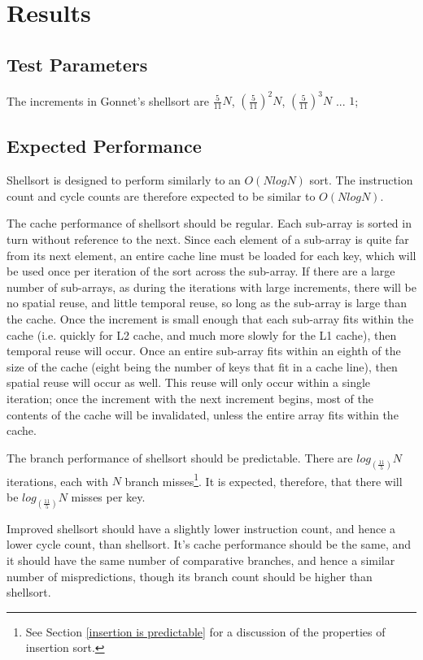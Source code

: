 
\section{Results}
\subsection{Test Parameters}
The increments in Gonnet's shellsort are $\frac{5}{11}N$, $(\frac{5}{11})^2N$,
$(\frac{5}{11})^3N$ ... $1$;

\subsection{Expected Performance}
Shellsort is designed to perform similarly to an $O(NlogN)$ sort. The instruction
count and cycle counts are therefore expected to be similar to $O(NlogN)$.

The cache performance of shellsort should be regular. Each sub-array is sorted in
turn without reference to the next. Since each element of a sub-array is quite
far from its next element, an entire cache line must be loaded for each key,
which will be used once per iteration of the sort across the sub-array. If there
are a large number of sub-arrays, as during the iterations with large increments,
there will be no spatial reuse, and little temporal reuse, so long as the
sub-array is large than the cache. Once the increment is small enough that each
sub-array fits within the cache (i.e. quickly for L2 cache, and much more slowly
for the L1 cache), then temporal reuse will occur. Once an entire sub-array fits
within an eighth of the size of the cache (eight being the number of keys
that fit in a cache line), then spatial reuse will occur as well.  This reuse
will only occur within a single iteration; once the increment with the next
increment begins, most of the contents of the cache will be invalidated, unless
the entire array fits within the cache.

The branch performance of shellsort should be predictable. There are
$log_{(\frac{11}{5})}N$ iterations, each with $N$ branch misses\footnote{See Section
\ref{insertion is predictable} for a discussion of the properties of insertion
sort.}. It is expected, therefore, that there will be $log_{(\frac{11}{5})}N$ misses per
key.

Improved shellsort should have a slightly lower instruction count, and hence a
lower cycle count, than shellsort. It's cache performance should be the same,
and it should have the same number of comparative branches, and hence a similar
number of mispredictions, though its branch count should be higher than
shellsort.


